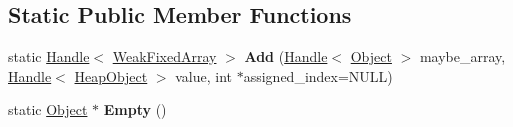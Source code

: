 \subsection*{Static Public Member Functions}
\begin{DoxyCompactItemize}
\item 
static \hyperlink{classv8_1_1internal_1_1_handle}{Handle}$<$ \hyperlink{classv8_1_1internal_1_1_weak_fixed_array}{Weak\+Fixed\+Array} $>$ {\bfseries Add} (\hyperlink{classv8_1_1internal_1_1_handle}{Handle}$<$ \hyperlink{classv8_1_1internal_1_1_object}{Object} $>$ maybe\+\_\+array, \hyperlink{classv8_1_1internal_1_1_handle}{Handle}$<$ \hyperlink{classv8_1_1internal_1_1_heap_object}{Heap\+Object} $>$ value, int $\ast$assigned\+\_\+index=N\+U\+LL)\hypertarget{classv8_1_1internal_1_1_weak_fixed_array_a7f93851978fe66eb15f157cc257bdd2e}{}\label{classv8_1_1internal_1_1_weak_fixed_array_a7f93851978fe66eb15f157cc257bdd2e}

\item 
static \hyperlink{classv8_1_1internal_1_1_object}{Object} $\ast$ {\bfseries Empty} ()\hypertarget{classv8_1_1internal_1_1_weak_fixed_array_a51961cab8d3bda6fae291e4e9ec87500}{}\label{classv8_1_1internal_1_1_weak_fixed_array_a51961cab8d3bda6fae291e4e9ec87500}

\end{DoxyCompactItemize}
